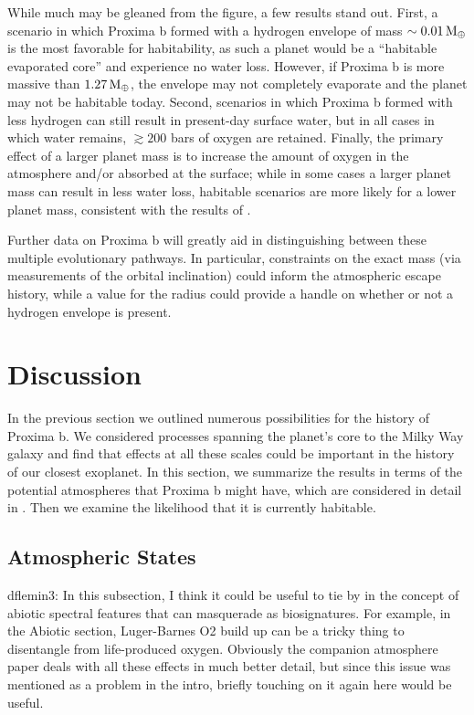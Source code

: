 \documentclass[preprint,12pt]{aastex}
\newcommand{\xxx}[1]{{\color{red} #1}} %
\def\mearth{{\rm\,M_\oplus}}
\begin{document}
While much may be gleaned from the figure, a few results stand
out. First, a scenario in which Proxima b formed with a hydrogen
envelope of mass $\sim 0.01 \mearth$ is the most favorable for
habitability, as such a planet would be a ``habitable evaporated
core'' \citep{Luger15} and experience no water loss. However, if
Proxima b is more massive than $1.27 \mearth$, the envelope may not
completely evaporate and the planet may not be habitable
today. Second, scenarios in which Proxima b formed with less hydrogen
can still result in present-day surface water, but in all cases in
which water remains, $\gtrsim 200$ bars of oxygen are
retained. Finally, the primary effect of a larger planet mass is to
increase the amount of oxygen in the atmosphere and/or absorbed at the
surface; while in some cases a larger planet mass can result in less
water loss, habitable scenarios are more likely for a lower planet
mass, consistent with the results of \cite{LugerBarnes15}.

Further data on Proxima b will greatly aid in distinguishing between
these multiple evolutionary pathways. In particular, constraints on
the exact mass (via measurements of the orbital inclination) could
inform the atmospheric escape history, while a value for the radius
could provide a handle on whether or not a hydrogen envelope is
present.

\section{Discussion\label{sec:disc}}

In the previous section we outlined numerous possibilities for the
history of Proxima b. We considered processes spanning the planet's
core to the Milky Way galaxy and find that effects at all these scales
could be important in the history of our closest exoplanet. In this
section, we summarize the results in terms of the potential
atmospheres that Proxima b might have, which are considered in
detail in \citep{Meadows16}. Then we examine the likelihood that it is
currently habitable.

\subsection{Atmospheric States}
\label{sec:results:atmstates}

\xxx{dflemin3:  In this subsection, I think it could be useful to tie by in the concept of abiotic spectral features that can 
masquerade as biosignatures.  For example, in the Abiotic section, Luger-Barnes O2 build up can be a tricky thing to
disentangle from life-produced oxygen.  Obviously the companion atmosphere paper deals with all these effects in much
better detail, but since this issue was mentioned as a problem in the intro, briefly touching on it again here would be useful.}
\end{document}
